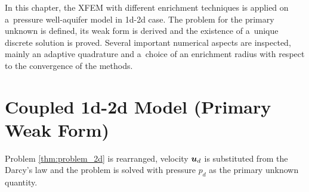 

% 

In this chapter, the XFEM with different enrichment techniques is applied on a~pressure well-aquifer model
in 1d-2d case. The problem for the primary unknown is defined, its weak form is derived and
the existence of a~unique discrete solution is proved.
Several important numerical aspects are inspected, mainly an adaptive quadrature and
a~choice of an enrichment radius with respect to the convergence of the methods.

\section{Coupled 1d-2d Model (Primary Weak Form)}
\label{sec:primary_form}

Problem \ref{thm:problem_2d} is rearranged, velocity $\mathbf{\boldsymbol{u}}_d$ is substituted from the Darcy's law and the problem is solved
with pressure $p_d$ as the primary unknown quantity.

